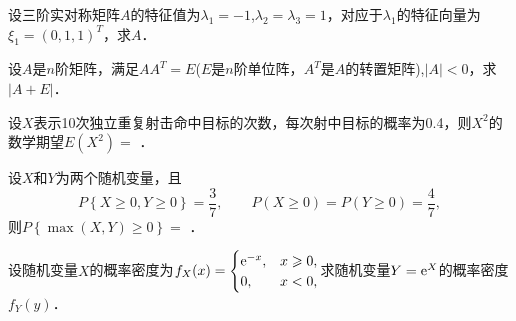 \documentclass[plain,noanswer,medmath]{../../template/jnuexam}
\begin{document}

\begin{problem}
设三阶实对称矩阵$A$的特征值为$\lambda_1 = - 1$,$\lambda_2 = \lambda_3 = 1$，对应于$\lambda_1$的特征向量为$\xi_1 = (0,1,1)^T$，求$A$．
\end{problem}



\begin{problem}
设$A$是$n$阶矩阵，满足$AA^T = E$($E$是$n$阶单位阵，$A^T$是$A$的转置矩阵),$|A| < 0$，求$\left| A + E \right|$．
\end{problem}




\begin{problem}
设$X$表示10次独立重复射击命中目标的次数，每次射中目标的概率为0.4，则$X^2$的数学期望$E(X^2) =$ \fillin{}．
\end{problem}


\begin{problem}
设$X$和$Y$为两个随机变量，且
$$P\left\{X \ge 0,Y \ge 0 \right\} = \frac{3}{7},
\qquad P(X \ge 0) = P(Y \ge 0) = \frac{4}{7},$$
则$P\left\{\max(X,Y) \ge 0 \right\} =$ \fillin{}．
\end{problem}



\begin{problem}
设随机变量$X$的概率密度为$f_X(x) = \begin{cases}
 \mathrm{e}^{-x}, & x \geqslant 0,\\
 0, & x < 0,
\end{cases}$求随机变量$Y = \mathrm{e}^X$的概率密度$f_Y(y)$．
\end{problem}
\end{document}
